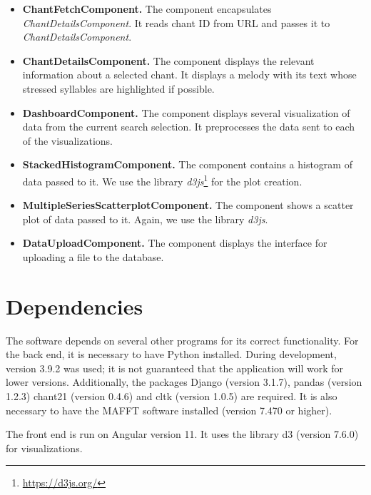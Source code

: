 \begin{itemize}
\item\textbf{ChantFetchComponent.} The component encapsulates \emph{ChantDetailsComponent}. It reads chant ID from URL and passes it to \emph{ChantDetailsComponent}.

\item\textbf{ChantDetailsComponent.} The component displays the relevant information about a selected chant. It displays a melody with its text whose stressed
syllables are highlighted if possible.

\item\textbf{DashboardComponent.} The component displays several visualization of data from the current search selection. It preprocesses the data sent to
each of the visualizations.

\item\textbf{StackedHistogramComponent.} The component contains a histogram of data passed to it. We use the library \emph{d3js}\footnote{\url{https://d3js.org/}}
for the plot creation.

\item\textbf{MultipleSeriesScatterplotComponent.} The component shows a scatter plot of data passed to it. Again, we use the library \emph{d3js}.

\item\textbf{DataUploadComponent.} The component displays the interface for uploading a file to the database.

\end{itemize}

\section{Dependencies}

The software depends on several other programs for its correct functionality. For the back end, it is necessary to have Python installed. During development,
version 3.9.2 was used; it is not guaranteed that the application will work for lower versions. Additionally, the packages Django (version 3.1.7), pandas (version 1.2.3)
chant21 (version 0.4.6) and cltk (version 1.0.5) are required. It is also necessary to have the MAFFT software installed (version 7.470 or higher).

The front end is run on Angular version 11. It uses the library d3 (version 7.6.0) for visualizations.

